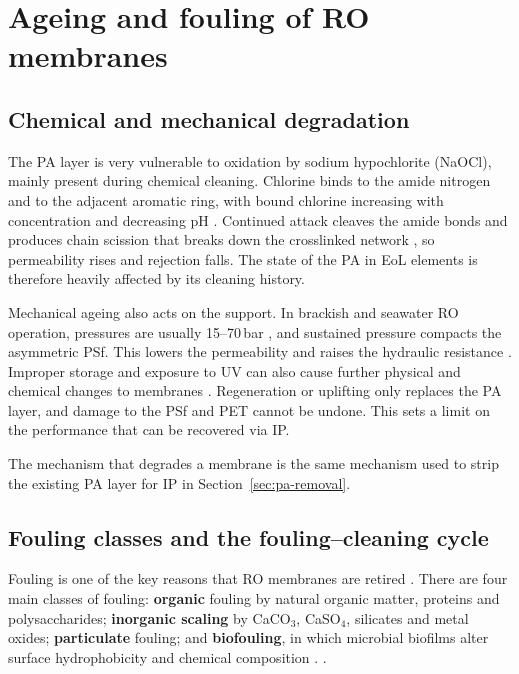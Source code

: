 \section{Ageing and fouling of RO membranes}
\label{sec:degradation}

\subsection{Chemical and mechanical degradation}
The PA layer is very vulnerable to oxidation by sodium hypochlorite (NaOCl), mainly present during chemical cleaning. Chlorine binds to the amide nitrogen and to the adjacent aromatic ring, with bound chlorine increasing with concentration and decreasing pH \citep{Kwon2006a}. Continued attack cleaves the amide bonds and produces chain scission that breaks down the crosslinked network \citep{Kwon2006a}, so permeability rises and rejection falls. The state of the PA in EoL elements is therefore heavily affected by its cleaning history.

Mechanical ageing also acts on the support. In brackish and seawater RO operation, pressures are usually 15--70\,bar \citep{Greenlee2009}, and sustained pressure compacts the asymmetric PSf. This lowers the permeability and raises the hydraulic resistance \citep{Molinaa2018}. Improper storage and exposure to UV can also cause further physical and chemical changes to membranes \citep{Ogbe2025}. Regeneration or uplifting only replaces the PA layer, and damage to the PSf and PET cannot be undone. This sets a limit on the performance that can be recovered via IP.

The mechanism that degrades a membrane is the same mechanism used to strip the existing PA layer for IP in Section~\ref{sec:pa-removal}.

\subsection{Fouling classes and the fouling--cleaning cycle}
Fouling is one of the key reasons that RO membranes are retired \citep{GarciaPacheco2015}. There are four main classes of fouling: \textbf{organic} fouling by natural organic matter, proteins and polysaccharides; \textbf{inorganic scaling} by CaCO$_3$, CaSO$_4$, silicates and metal oxides; \textbf{particulate} fouling; and \textbf{biofouling}, in which microbial biofilms alter surface hydrophobicity and chemical composition \citep{MohiuddinAhmed2010}. .

